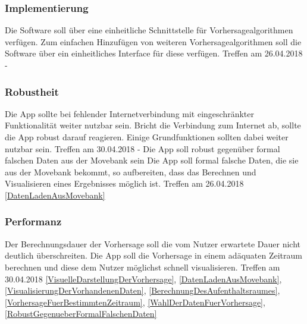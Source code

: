 \documentclass[12pt]{article} %
\begin{document}
\subsubsection{Implementierung}

\begin{requirements}[ref={(R\arabic*)},label=(R\arabic*),resume]
{
 Die Software soll über eine einheitliche Schnittstelle für Vorhersagealgorithmen verfügen.
 }{
 Zum einfachen Hinzufügen von weiteren Vorhersagealgorithmen soll die Software über ein einheitliches Interface für diese verfügen.
 }{
 Treffen am 26.04.2018
 }{
 -
}
\end{requirements}

\subsubsection{Robustheit}

\begin{requirements}[ref={(R\arabic*)},label=(R\arabic*),resume]
{
 Die App sollte bei fehlender Internetverbindung mit eingeschränkter Funktionalität weiter nutzbar sein. 
 }{
 Bricht die Verbindung zum Internet ab, sollte die App robust darauf reagieren. Einige Grundfunktionen sollten dabei weiter nutzbar sein. 
 }{
 Treffen am 30.04.2018 
 }{
 - 
}
{
 Die App soll robust gegenüber formal falschen Daten aus der Movebank sein 
 }{
 Die App soll formal falsche Daten, die sie aus der Movebank bekommt, so aufbereiten, dass das Berechnen und Visualisieren eines Ergebnisses möglich ist. 
 }{
 Treffen am 26.04.2018 
 }{
 \ref{DatenLadenAusMovebank} 
}
\end{requirements}

\subsubsection{Performanz}

\begin{requirements}[ref={(R\arabic*)},label=(R\arabic*),resume]

{
 Der Berechnungsdauer der Vorhersage soll die vom Nutzer erwartete Dauer nicht deutlich überschreiten. 
 }{
 Die App soll die Vorhersage in einem adäquaten Zeitraum berechnen und diese dem Nutzer möglichst schnell visualisieren. 
 }{
 Treffen am 30.04.2018 
 }{
 \ref{VisuelleDarstellungDerVorhersage}, \ref{DatenLadenAusMovebank}, \ref{VisualisierungDerVorhandenenDaten}, \ref{BerechnungDesAufenthaltsraumes}, \ref{VorhersageFuerBestimmtenZeitraum}, \ref{WahlDerDatenFuerVorhersage}, \ref{RobustGegenueberFormalFalschenDaten} 
}

\end{requirements}
\end{document}
